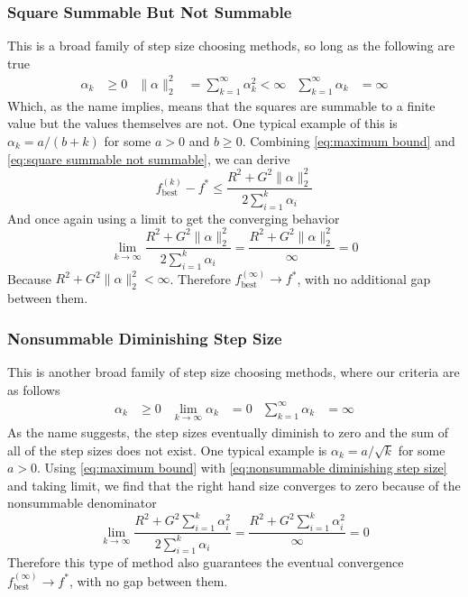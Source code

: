 \documentclass[journal,onecolumn]{IEEEtran}
\DeclareMathOperator{\best}{best}
\begin{document}
\subsubsection{Square Summable But Not Summable}\label{sec:square summable not summable}
This is a broad family of step size choosing methods, so long as the following are true
\begin{equation}\label{eq:square summable not summable}
\begin{aligned}
\alpha_k &\geq 0 & \|\alpha\|^2_2&= \sum_{k=1}^{\infty} \alpha_k^2 < \infty & \sum_{k=1}^{\infty} \alpha_k &= \infty
\end{aligned}
\end{equation}
Which, as the name implies, means that the squares are summable to a finite value but the values themselves are not. One typical example of this is \(\alpha_k = a/(b+k)\) for some \(a > 0\) and \(b \geq 0\). Combining \eqref{eq:maximum bound} and \eqref{eq:square summable not summable}, we can derive
\begin{equation}\label{eq:square summable not summable bound}
f^{(k)}_{\best}-f^* \leq \frac{R^2  + G^2 \|\alpha\|_2^2}{2\sum^k_{i=1}\alpha_i}
\end{equation}
And once again using a limit to get the converging behavior
\begin{equation}\label{eq:square summable not summable convergence}
\lim_{k \rightarrow \infty} \frac{R^2  + G^2 \|\alpha\|_2^2}{2 \sum^k_{i=1}\alpha_i} = \frac{R^2  + G^2 \|\alpha\|_2^2}{\infty} = 0
\end{equation}
Because \(R^2 + G^2\|\alpha\|^2_2 < \infty\). Therefore \(f^{(\infty)}_{\best} \rightarrow f^*\), with no additional gap between them.

\subsubsection{Nonsummable Diminishing Step Size}\label{sec:nonsummable diminishing step size}
This is another broad family of step size choosing methods, where our criteria are as follows
\begin{equation}\label{eq:nonsummable diminishing step size}
\begin{aligned}
\alpha_k &\geq 0 & 
\lim_{k \rightarrow \infty} \alpha_k &= 0 & 
\sum_{k=1}^{\infty} \alpha_k &= \infty
\end{aligned}
\end{equation}
As the name suggests, the step sizes eventually diminish to zero and the sum of all of the step sizes does not exist. One typical example is \(\alpha_k = a/\sqrt{k}\) for some \(a > 0\). Using \eqref{eq:maximum bound} with \eqref{eq:nonsummable diminishing step size} and taking limit, we find that the right hand size converges to zero because of the nonsummable denominator
\begin{equation}\label{eq:nonsummable diminishing step size convergence}
\lim_{k \rightarrow \infty} \frac{R^2  + G^2 \sum^k_{i=1}\alpha^2_i}{2\sum^k_{i=1}\alpha_i} = \frac{R^2  + G^2 \sum^k_{i=1}\alpha^2_i}{\infty} = 0
\end{equation}
Therefore this type of method also guarantees the eventual convergence \(f^{(\infty)}_{\best} \rightarrow f^*\), with no gap between them.
\end{document}
